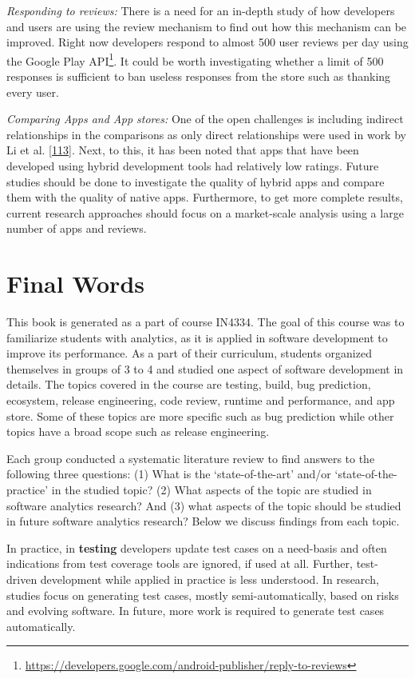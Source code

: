 \documentclass[]{book}
\let\rmarkdownfootnote\footnote%
\def\footnote{\protect\rmarkdownfootnote}
\begin{document}
\emph{Responding to reviews:} There is a need for an in-depth study of
how developers and users are using the review mechanism to find out how
this mechanism can be improved. Right now developers respond to almost
500 user reviews per day using the Google Play API\footnote{\url{https://developers.google.com/android-publisher/reply-to-reviews}}.
It could be worth investigating whether a limit of 500 responses is
sufficient to ban useless responses from the store such as thanking
every user.

\emph{Comparing Apps and App stores:} One of the open challenges is
including indirect relationships in the comparisons as only direct
relationships were used in work by Li et al.
{[}\protect\hyperlink{ref-li2017mining}{113}{]}. Next, to this, it has
been noted that apps that have been developed using hybrid development
tools had relatively low ratings. Future studies should be done to
investigate the quality of hybrid apps and compare them with the quality
of native apps. Furthermore, to get more complete results, current
research approaches should focus on a market-scale analysis using a
large number of apps and reviews.

\chapter{Final Words}\label{final-words}

This book is generated as a part of course IN4334. The goal of this
course was to familiarize students with analytics, as it is applied in
software development to improve its performance. As a part of their
curriculum, students organized themselves in groups of 3 to 4 and
studied one aspect of software development in details. The topics
covered in the course are testing, build, bug prediction, ecosystem,
release engineering, code review, runtime and performance, and app
store. Some of these topics are more specific such as bug prediction
while other topics have a broad scope such as release engineering.

Each group conducted a systematic literature review to find answers to
the following three questions: (1) What is the `state-of-the-art' and/or
`state-of-the-practice' in the studied topic? (2) What aspects of the
topic are studied in software analytics research? And (3) what aspects
of the topic should be studied in future software analytics research?
Below we discuss findings from each topic.

In practice, in \textbf{testing} developers update test cases on a
need-basis and often indications from test coverage tools are ignored,
if used at all. Further, test-driven development while applied in
practice is less understood. In research, studies focus on generating
test cases, mostly semi-automatically, based on risks and evolving
software. In future, more work is required to generate test cases
automatically.
\end{document}
